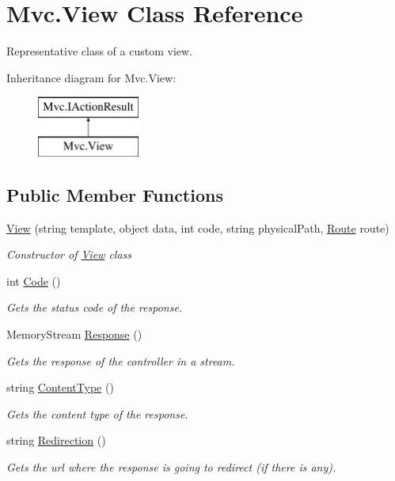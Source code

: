 \hypertarget{class_mvc_1_1_view}{}\section{Mvc.\+View Class Reference}
\label{class_mvc_1_1_view}


Representative class of a custom view.  


Inheritance diagram for Mvc.\+View\+:\begin{figure}[H]
\begin{center}
\leavevmode
\includegraphics[height=2.000000cm]{class_mvc_1_1_view}
\end{center}
\end{figure}
\subsection*{Public Member Functions}
\begin{DoxyCompactItemize}
\item 
\hyperlink{class_mvc_1_1_view_a8a3cc05e4b1f355a5668970c7e633e85}{View} (string template, object data, int code, string physical\+Path, \hyperlink{class_mvc_1_1_route}{Route} route)
\begin{DoxyCompactList}\small\item\em Constructor of \hyperlink{class_mvc_1_1_view}{View} class \end{DoxyCompactList}\item 
int \hyperlink{class_mvc_1_1_view_a7e723a9bafb2f876175d1396c06da062}{Code} ()
\begin{DoxyCompactList}\small\item\em Gets the status code of the response. \end{DoxyCompactList}\item 
Memory\+Stream \hyperlink{class_mvc_1_1_view_a8a5a1a1990be0c3704b4f3262c503a2a}{Response} ()
\begin{DoxyCompactList}\small\item\em Gets the response of the controller in a stream. \end{DoxyCompactList}\item 
string \hyperlink{class_mvc_1_1_view_a0b14b3b8e85c97ada45a32dfcc30f157}{Content\+Type} ()
\begin{DoxyCompactList}\small\item\em Gets the content type of the response. \end{DoxyCompactList}\item 
string \hyperlink{class_mvc_1_1_view_a6628a16ae93e0269d91413a3a38d0132}{Redirection} ()
\begin{DoxyCompactList}\small\item\em Gets the url where the response is going to redirect (if there is any). \end{DoxyCompactList}\end{DoxyCompactItemize}


